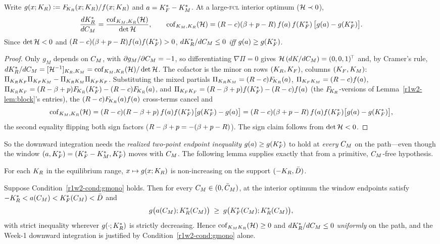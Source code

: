 \begin{lemma}\label{r1w2-lem:cofactor}
Write $g(x;K_R)\vcentcolon=F_{\!K_R}(x;K_R)/f(x;K_R)$ and $a=K_F^{*}-K_M^{*}$. At a large-\textsc{fcl}
interior optimum ($\mathcal H\prec0$),
\begin{equation}\label{r1w2-eq:cofactor}
  \frac{dK_R^{*}}{dC_M}=\frac{\operatorname{cof}_{K_M,K_R}(\mathcal H)}{\det\mathcal H},
  \qquad
  \operatorname{cof}_{K_M,K_R}(\mathcal H)=(R-c)(\beta+p-R)\,f(a)\,f(K_F^{*})\,\big[g(a)-g(K_F^{*})\big].
\end{equation}
Since $\det\mathcal H<0$ and $(R-c)(\beta+p-R)f(a)f(K_F^{*})>0$, $dK_R^{*}/dC_M\le0$ \emph{iff}
$g(a)\ge g(K_F^{*})$.
\end{lemma}
\begin{proof}
Only $g_M$ depends on $C_M$, with $\partial g_M/\partial C_M=-1$, so differentiating
$\nabla\Pi=0$ gives $\mathcal H\,(dK/dC_M)=(0,0,1)^{\!\top}$ and, by Cramer's rule,
$dK_R^{*}/dC_M=[\mathcal H^{-1}]_{K_R,K_M}=\operatorname{cof}_{K_M,K_R}(\mathcal H)/\det\mathcal H$. The cofactor is
the minor on rows $(K_R,K_F)$, columns $(K_F,K_M)$:
$\Pi_{K_RK_F}\Pi_{K_FK_M}-\Pi_{K_RK_M}\Pi_{K_FK_F}$. Substituting the mixed partials
$\Pi_{K_RK_M}=(R-c)F_{\!K_R}(a)$, $\Pi_{K_FK_M}=(R-c)f(a)$,
$\Pi_{K_RK_F}=(R-\beta+p)F_{\!K_R}(K_F^{*})-(R-c)F_{\!K_R}(a)$, and
$\Pi_{K_FK_F}=(R-\beta+p)f(K_F^{*})-(R-c)f(a)$ (the $F_{\!K_R}$-versions of
Lemma~\ref{r1w2-lem:block}'s entries), the $(R-c)F_{\!K_R}(a)f(a)$ cross-terms cancel and
\[
  \operatorname{cof}_{K_M,K_R}(\mathcal H)=(R-c)(R-\beta+p)\,f(a)f(K_F^{*})\big[g(K_F^{*})-g(a)\big]
  =(R-c)(\beta+p-R)\,f(a)f(K_F^{*})\big[g(a)-g(K_F^{*})\big],
\]
the second equality flipping both sign factors ($R-\beta+p=-(\beta+p-R)$). The sign claim
follows from $\det\mathcal H<0$.
\end{proof}

So the downward integration needs the \emph{realized two-point endpoint inequality}
$g(a)\ge g(K_F^{*})$ to hold at \emph{every} $C_M$ on the path---even though the
window $(a,K_F^{*})=(K_F^{*}-K_M^{*},K_F^{*})$ moves with $C_M$. The following lemma supplies
exactly that from a primitive, $C_M$-free hypothesis.

\begin{condition}\label{r1w2-cond:gmono}
For each $K_R$ in the equilibrium range, $x\mapsto g(x;K_R)$ is non-increasing on
the support $(-K_R,\bar D)$.
\end{condition}

\begin{lemma}\label{r1w2-lem:uniform}
Suppose Condition~\ref{r1w2-cond:gmono} holds. Then for every $C_M\in(0,\bar C_M)$, at
the interior optimum the window endpoints satisfy
$-K_R^{*}<a(C_M)<K_F^{*}(C_M)<\bar D$ and
\begin{equation}\label{r1w2-eq:endpoint}
  g\big(a(C_M);K_R^{*}(C_M)\big)\;\ge\;g\big(K_F^{*}(C_M);K_R^{*}(C_M)\big),
\end{equation}
with strict inequality wherever $g(\cdot;K_R^{*})$ is strictly decreasing. Hence
$\operatorname{cof}_{K_MK_R}(\mathcal H)\ge0$ and $dK_R^{*}/dC_M\le0$ \emph{uniformly} on the path, and
the Week-1 downward integration is justified by Condition~\ref{r1w2-cond:gmono} alone.
\end{lemma}

